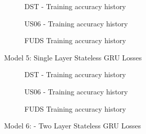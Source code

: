 \begin{figure}[htbp]
    \centering
    \begin{subfigure}[b]{0.95\textwidth}
        \centering
        
        \caption{DST - Training accuracy history}
    \end{subfigure}
    \hfill
    \begin{subfigure}[b]{0.95\textwidth}
        \centering
        
        \caption{US06 - Training accuracy history}
    \end{subfigure}
    \hfill
    \begin{subfigure}[b]{0.95\textwidth}
        \centering
        
        \caption{FUDS Training accuracy history}
    \end{subfigure}    
    \caption{Model 5: Single Layer Stateless GRU Losses}
    \label{fig:Model-5losses}
\end{figure}
\begin{figure}[htbp]
    \centering
    \begin{subfigure}[b]{0.95\textwidth}
        \centering
        
        \caption{DST - Training accuracy history}
    \end{subfigure}
    \hfill
    \begin{subfigure}[b]{0.95\textwidth}
        \centering
        
        \caption{US06 - Training accuracy history}
    \end{subfigure}
    \hfill
    \begin{subfigure}[b]{0.95\textwidth}
        \centering
        
        \caption{FUDS Training accuracy history}
    \end{subfigure}    
    \caption{Model 6: - Two Layer Stateless GRU Losses}
    \label{fig:Model-6losses}
\end{figure}
